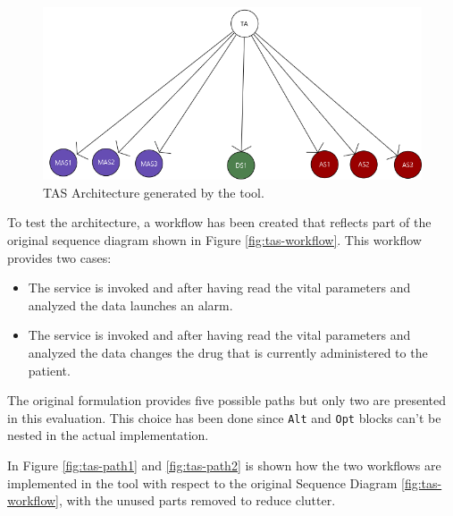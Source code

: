 \begin{figure}[ht]
	\centerline
	{\includegraphics[scale=0.55]{img/TeleAssistance.png}}
	\caption[TAS Architecture]{TAS Architecture generated by the tool.}
	\label{fig:tas-arch}
\end{figure}

To test the architecture, a workflow has been created that reflects part of the original sequence diagram shown in Figure \ref{fig:tas-workflow}. This workflow provides two cases:
\begin{itemize}
	\item The service is invoked and after having read the vital parameters and analyzed the data launches an alarm.
	\item The service is invoked and after having read the vital parameters and analyzed the data changes the drug that is currently administered to the patient.
\end{itemize}

The original formulation provides five possible paths but only two are presented in this evaluation. This choice has been done since \texttt{Alt} and \texttt{Opt} blocks can't be nested in the actual implementation.

In Figure \ref{fig:tas-path1} and \ref{fig:tas-path2} is shown how the two workflows are implemented in the tool with respect to the original Sequence Diagram \ref{fig:tas-workflow}, with the unused parts removed to reduce clutter.

\clearpage
